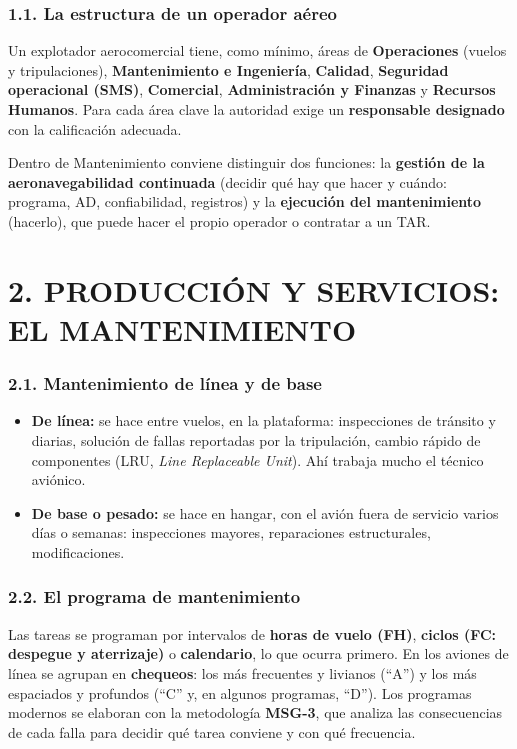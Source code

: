 \subsubsection*{1.1. La estructura de un operador aéreo}
Un explotador aerocomercial tiene, como mínimo, áreas de \textbf{Operaciones} (vuelos y
tripulaciones), \textbf{Mantenimiento e Ingeniería}, \textbf{Calidad}, \textbf{Seguridad
operacional (SMS)}, \textbf{Comercial}, \textbf{Administración y Finanzas} y \textbf{Recursos
Humanos}. Para cada área clave la autoridad exige un \textbf{responsable designado} con la
calificación adecuada.

Dentro de Mantenimiento conviene distinguir dos funciones: la \textbf{gestión de la
aeronavegabilidad continuada} (decidir qué hay que hacer y cuándo: programa, AD, confiabilidad,
registros) y la \textbf{ejecución del mantenimiento} (hacerlo), que puede hacer el propio operador
o contratar a un TAR.

\section*{2. PRODUCCIÓN Y SERVICIOS: EL MANTENIMIENTO}

\subsubsection*{2.1. Mantenimiento de línea y de base}
\begin{itemize}
  \item \textbf{De línea:} se hace entre vuelos, en la plataforma: inspecciones de tránsito y
        diarias, solución de fallas reportadas por la tripulación, cambio rápido de componentes
        (LRU, \textit{Line Replaceable Unit}). Ahí trabaja mucho el técnico aviónico.
  \item \textbf{De base o pesado:} se hace en hangar, con el avión fuera de servicio varios días
        o semanas: inspecciones mayores, reparaciones estructurales, modificaciones.
\end{itemize}

\subsubsection*{2.2. El programa de mantenimiento}
Las tareas se programan por intervalos de \textbf{horas de vuelo (FH)}, \textbf{ciclos (FC:
despegue y aterrizaje)} o \textbf{calendario}, lo que ocurra primero. En los aviones de línea se
agrupan en \textbf{chequeos}: los más frecuentes y livianos (``A'') y los más espaciados y
profundos (``C'' y, en algunos programas, ``D''). Los programas modernos se elaboran con la
metodología \textbf{MSG-3}, que analiza las consecuencias de cada falla para decidir qué tarea
conviene y con qué frecuencia.

